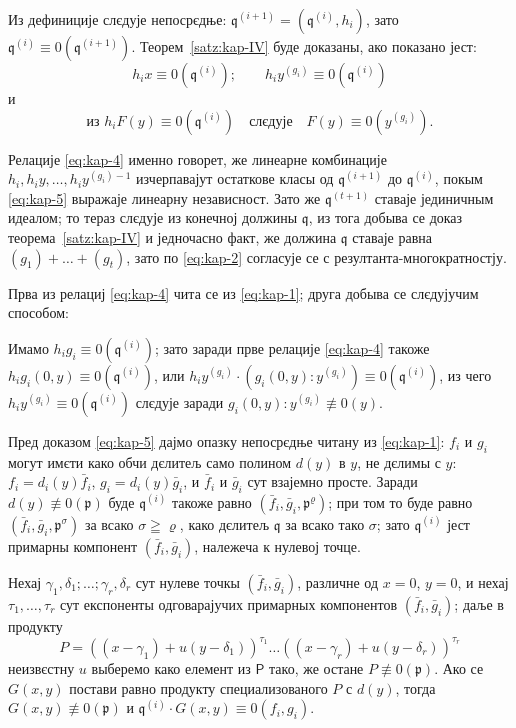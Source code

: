 \documentclass[11pt]{article}
\theoremstyle{plain}
\begin{document}
Из дефиниције слєдује непосрєдње:
$\mathfrak{q}^{(i+1)} = (\mathfrak{q}^{(i)}, h_{i})$, зато
$\mathfrak{q}^{(i)} \equiv 0(\mathfrak{q}^{(i+1)})$.
Теорем~\ref{satz:kap-IV} буде доказаны, ако показано јест:
\begin{equation}\label{eq:kap-4}
h_{i}x \equiv 0(\mathfrak{q}^{(i)}); \qquad
h_{i}y^{(g_{i})} \equiv 0(\mathfrak{q}^{(i)})
\end{equation}
и
\begin{equation}\label{eq:kap-5}
\text{из } h_{i}F(y) \equiv 0(\mathfrak{q}^{(i)})
\quad \text{слєдује} \quad F(y) \equiv 0(y^{(g_{i})}).
\end{equation}

Релације \eqref{eq:kap-4} именно говорет, же линеарне комбинације
$h_{i}, h_{i}y, \ldots, h_{i}y^{(g_{i})-1}$ изчерпавајут
остаткове класы од $\mathfrak{q}^{(i+1)}$ до
$\mathfrak{q}^{(i)}$, покым \eqref{eq:kap-5} выражаје линеарну
независност. Зато же $\mathfrak{q}^{(t+1)}$ ставаје јединичным
идеалом; то тераз слєдује из конечној должины $\mathfrak{q}$,
из тога добыва се доказ теорема~\ref{satz:kap-IV} и једночасно
факт, же должина $\mathfrak{q}$ ставаје равна
$(g_1)+\ldots+(g_t)$, зато по \eqref{eq:kap-2} согласује се
с резултанта-многократностју.

Прва из релациј \eqref{eq:kap-4} чита се из \eqref{eq:kap-1};
друга добыва се слєдујучим способом:

Имамо $h_{i}g_{i} \equiv 0(\mathfrak{q}^{(i)})$; зато заради прве
релације \eqref{eq:kap-4} такоже
$h_{i}g_{i}(0,y) \equiv 0(\mathfrak{q}^{(i)})$, или
$h_iy^{(g_i)}\cdot(g_i(0,y):y^{(g_i)})\equiv0(\mathfrak{q}^{(i)})$,
из чего $h_{i}y^{(g_{i})} \equiv 0(\mathfrak{q}^{(i)})$
слєдује заради $g_{i}(0,y):y^{(g_{i})} \not\equiv 0(y)$.

Пред доказом \eqref{eq:kap-5} дајмо опазку непосрєдње читану из
\eqref{eq:kap-1}: $f_{i}$ и $g_{i}$ могут имєти како обчи дєлитељ
само полином $d(y)$ в $y$, не дєлимы с $y$:
$f_{i} = d_{i}(y)\bar{f}_{i}$, $g_{i} = d_{i}(y)\bar{g}_{i}$, и
$\bar{f}_{i}$ и $\bar{g}_{i}$ сут взајемно просте. Заради
$d(y)\not\equiv0(\mathfrak{p})$ буде $\mathfrak{q}^{(i)}$
такоже равно $(\bar f_i,\bar g_i,\mathfrak{p}^\varrho)$;
при том то буде равно
$(\bar{f}_{i}, \bar{g}_{i}, \mathfrak{p}^{\sigma})$ за всако
$\sigma\geqq\varrho$, како дєлитељ $\mathfrak{q}$ за всако
тако $\sigma$; зато $\mathfrak{q}^{(i)}$ јест примарны компонент
$(\bar{f}_{i}, \bar{g}_{i})$, належеча к нулевој точце.

Нехај $\gamma_{1}, \delta_{1}; \ldots; \gamma_{r}, \delta_{r}$ сут
нулеве точкы $(\bar{f}_{i}, \bar{g}_{i})$, различне од
$x = 0$, $y = 0$, и нехај $\tau_{1}, \ldots, \tau_{r}$ сут експоненты
одговарајучих примарных компонентов $(\bar{f}_{i}, \bar{g}_{i})$;
даље в продукту
\[
P = ((x-\gamma_{1}) + u(y-\delta_{1}))^{\tau_{1}} \ldots
((x-\gamma_{r}) + u(y-\delta_{r}))^{\tau_{r}}
\]
неизвєстну $u$ выберемо како елемент из $\mathsf{P}$ тако, же остане
$P \not\equiv 0(\mathfrak{p})$. Ако се $G(x,y)$ постави равно
продукту специализованого $P$ с $d(y)$, тогда
$G(x,y) \not\equiv 0(\mathfrak{p})$ и
$\mathfrak{q}^{(i)} \cdot G(x,y) \equiv 0(f_{i}, g_{i})$.
\end{document}
